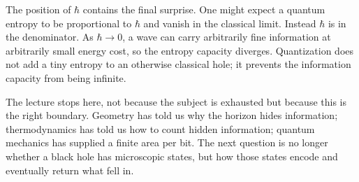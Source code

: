 The position of \(\hbar\) contains the final surprise.  One might expect a quantum entropy to be proportional to \(\hbar\) and vanish in the classical limit.  Instead \(\hbar\) is in the denominator.  As \(\hbar\to0\), a wave can carry arbitrarily fine information at arbitrarily small energy cost, so the entropy capacity diverges.  Quantization does not add a tiny entropy to an otherwise classical hole; it prevents the information capacity from being infinite.

\begin{classroomqa}
\end{classroomqa}

The lecture stops here, not because the subject is exhausted but because this is the right boundary.  Geometry has told us why the horizon hides information; thermodynamics has told us how to count hidden information; quantum mechanics has supplied a finite area per bit.  The next question is no longer whether a black hole has microscopic states, but how those states encode and eventually return what fell in.
